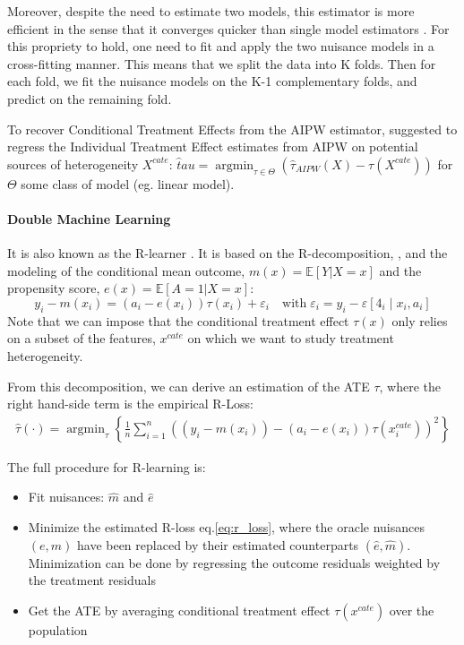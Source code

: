 \documentclass[french,12pt,twoside,a4paper]{book}
\DeclareMathOperator*{\argmin}{argmin} \def\mycitecolor{green!50!black}
\begin{document}
\begin{appendices}
  Moreover, despite the need to estimate two models, this estimator is more
  efficient in the sense that it converges quicker than single model estimators
  \citep{wager2020stats}. For this propriety to hold, one need to fit and apply
  the two nuisance models in a cross-fitting manner. This means that we split
  the data into K folds. Then for each fold, we fit the nuisance models on the
  K-1 complementary folds, and predict on the remaining fold.

  To recover Conditional Treatment Effects from the AIPW estimator,
  \cite{foster2019orthogonal} suggested to regress the Individual Treatment
  Effect estimates from AIPW on potential sources of heterogeneity $X^{cate}$:
  $\hat tau = \argmin_{\tau \in \Theta} (\hat \tau_{AIPW}(X) - \tau(X^{cate}))$
  for $\Theta$ some class of model (eg. linear model).

  \paragraph{Double Machine Learning} \citep{chernozhukov2018double} It is also known
  as the R-learner \citep{nie2021quasi}. It is based on the R-decomposition,
  \citep{robinson_rootnconsistent_1988}, and the modeling of the conditional mean outcome,
  $m(x)=\mathbb E[Y|X=x]$ and the propensity score, $e(x)=\mathbb E[A=1|X=x]$:
  \begin{equation}\label{eq:r_decomposition_dml}
    y_{i}-m\left(x_{i}\right)=\left(a_{i}-e\left(x_{i}\right)\right) \tau\left(x_{i}\right)+\varepsilon_{i} \quad \text{with} \; \varepsilon_{i}=y_{i}-\varepsilon\left[4_{i} \mid x_{i}, a_{i}\right]
  \end{equation}
  Note that we can impose that the conditional treatment effect $\tau(x)$ only
  relies on a subset of the features, $x^{cate}$ on which we want to study
  treatment heterogeneity.

  From this decomposition, we can derive an estimation of the ATE $\tau$, where
  the right hand-side term is the empirical R-Loss:
  \begin{align}\label{eq:r_loss}
    \hat{\tau}(\cdot)=\operatorname{argmin}_{\tau}\left\{\frac{1}{n} \sum_{i=1}^{n}\left(\left(y_{i}-m\left(x_{i}\right)\right)-\left(a_{i}-e(x_{i})\right) \tau\left(x^{cate}_{i}\right)\right)^{2}\right\}
  \end{align}

  The full procedure for R-learning is:
  \begin{itemize}
    \item Fit nuisances: $\hat m$ and $\hat e$
    \item Minimize the estimated R-loss eq.\ref{eq:r_loss}, where the oracle nuisances $(e, m)$
          have been replaced by their estimated counterparts $(\hat e, \hat m)$.
          Minimization can be done by regressing the outcome residuals weighted by the
          treatment residuals
    \item Get the ATE by averaging conditional treatment effect $\tau(x^{cate})$ over the population
  \end{itemize}


\end{appendices}
\end{document}
